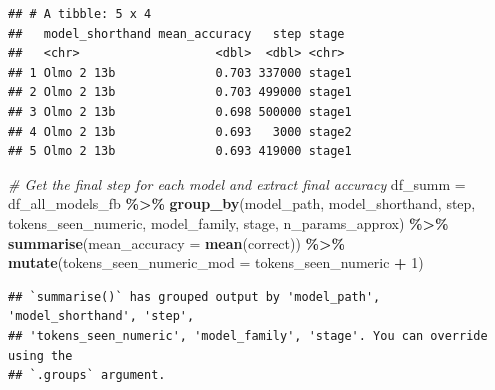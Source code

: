 \documentclass[
]{article}
\newenvironment{Shaded}{\begin{snugshade}}{\end{snugshade}}
\newcommand{\AttributeTok}[1]{\textcolor[rgb]{0.13,0.29,0.53}{#1}}
\newcommand{\CommentTok}[1]{\textcolor[rgb]{0.56,0.35,0.01}{\textit{#1}}}
\newcommand{\DecValTok}[1]{\textcolor[rgb]{0.00,0.00,0.81}{#1}}
\newcommand{\FunctionTok}[1]{\textcolor[rgb]{0.13,0.29,0.53}{\textbf{#1}}}
\newcommand{\NormalTok}[1]{#1}
\newcommand{\OtherTok}[1]{\textcolor[rgb]{0.56,0.35,0.01}{#1}}
\newcommand{\SpecialCharTok}[1]{\textcolor[rgb]{0.81,0.36,0.00}{\textbf{#1}}}
\begin{document}
\begin{verbatim}
## # A tibble: 5 x 4
##   model_shorthand mean_accuracy   step stage 
##   <chr>                   <dbl>  <dbl> <chr> 
## 1 Olmo 2 13b              0.703 337000 stage1
## 2 Olmo 2 13b              0.703 499000 stage1
## 3 Olmo 2 13b              0.698 500000 stage1
## 4 Olmo 2 13b              0.693   3000 stage2
## 5 Olmo 2 13b              0.693 419000 stage1
\end{verbatim}

\begin{Shaded}
\begin{Highlighting}[]
\CommentTok{\# Get the final step for each model and extract final accuracy}
\NormalTok{df\_summ }\OtherTok{=}\NormalTok{ df\_all\_models\_fb }\SpecialCharTok{\%\textgreater{}\%}
  \FunctionTok{group\_by}\NormalTok{(model\_path, model\_shorthand,}
\NormalTok{           step, tokens\_seen\_numeric, }
\NormalTok{           model\_family, stage, n\_params\_approx) }\SpecialCharTok{\%\textgreater{}\%}
  \FunctionTok{summarise}\NormalTok{(}\AttributeTok{mean\_accuracy =} \FunctionTok{mean}\NormalTok{(correct)) }\SpecialCharTok{\%\textgreater{}\%}
  \FunctionTok{mutate}\NormalTok{(}\AttributeTok{tokens\_seen\_numeric\_mod =}\NormalTok{ tokens\_seen\_numeric }\SpecialCharTok{+} \DecValTok{1}\NormalTok{)}
\end{Highlighting}
\end{Shaded}

\begin{verbatim}
## `summarise()` has grouped output by 'model_path', 'model_shorthand', 'step',
## 'tokens_seen_numeric', 'model_family', 'stage'. You can override using the
## `.groups` argument.
\end{verbatim}
\end{document}
